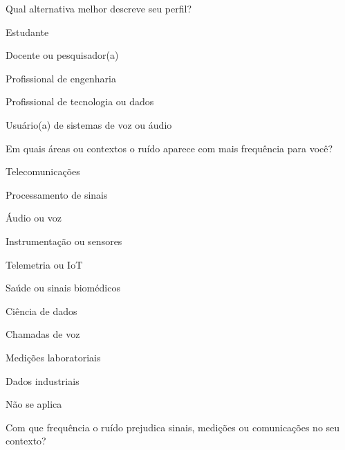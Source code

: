 
\begin{perguntaFormulario}{Qual alternativa melhor descreve seu perfil?}
\begin{opcoesFormularioDuasColunasCompactas}
    \item Estudante
    \item Docente ou pesquisador(a)
    \item Profissional de engenharia
    \item Profissional de tecnologia ou dados
    \item Usuário(a) de sistemas de voz ou áudio
\end{opcoesFormularioDuasColunasCompactas}
\end{perguntaFormulario}

\begin{perguntaFormulario}{Em quais áreas ou contextos o ruído aparece com mais frequência para você?}
\begin{opcoesFormularioDuasColunasCompactas}
    \item Telecomunicações
    \item Processamento de sinais
    \item Áudio ou voz
    \item Instrumentação ou sensores
    \item Telemetria ou IoT
    \item Saúde ou sinais biomédicos
    \item Ciência de dados
    \item Chamadas de voz
    \item Medições laboratoriais
    \item Dados industriais
    \item Não se aplica
\end{opcoesFormularioDuasColunasCompactas}
\end{perguntaFormulario}

\begin{perguntaFormulario}{Com que frequência o ruído prejudica sinais, medições ou comunicações no seu contexto?}
\end{perguntaFormulario}

